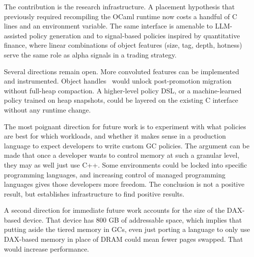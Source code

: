 \documentclass[sigconf]{acmart}
\begin{document}
The contribution is the research infrastructure. A placement hypothesis that previously required recompiling the OCaml runtime now costs a handful of C lines and an environment variable. The same interface is amenable to LLM-assisted policy generation and to signal-based policies inspired by quantitative finance, where linear combinations of object features (size, tag, depth, hotness) serve the same role as alpha signals in a trading strategy.

Several directions remain open. More convoluted features can be implemented and instrumented. Object handles~\cite{alaska2024} would unlock post-promotion migration without full-heap compaction. A higher-level policy DSL, or a machine-learned policy trained on heap snapshots, could be layered on the existing C interface without any runtime change.

The most poignant direction for future work is to experiment with what policies are best for which workloads, and whether it makes sense in a production language to expect developers to write custom GC policies. The argument can be made that once a developer wants to control memory at such a granular level, they may as well just use C++. Some environments could be locked into specific programming languages, and increasing control of managed programming languages gives those developers more freedom. The conclusion is not a positive result, but establishes infrastructure to find positive results.

A second direction for immediate future work accounts for the size of the DAX-based device. That device has 800 GB of addressable space, which implies that putting aside the tiered memory in GCs, even just porting a language to only use DAX-based memory in place of DRAM could mean fewer pages swapped. That would increase performance.




\appendix
\end{document}

